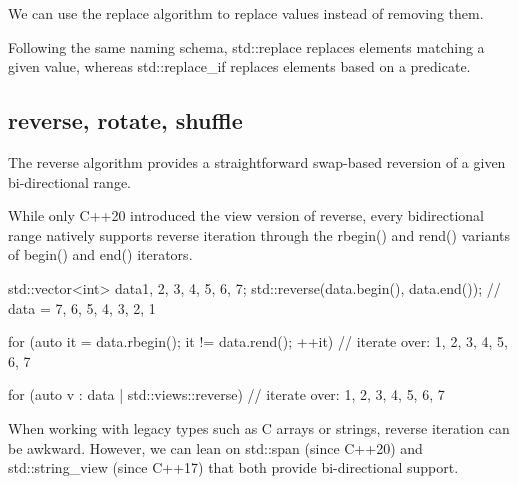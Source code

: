 We can use the replace algorithm to replace values instead of removing them.



Following the same naming schema, std::replace replaces elements matching a given value, whereas std::replace\_if replaces elements based on a predicate.

\begin{box-note}
\end{box-note}

\subsection{reverse, rotate, shuffle}

The reverse algorithm provides a straightforward swap-based reversion of a given bi-directional range.



While only C++20 introduced the view version of reverse, every bidirectional range natively supports reverse iteration through the rbegin() and rend() variants of begin() and end() iterators.

\begin{box-note}
\begin{cppcode}
std::vector<int> data{1, 2, 3, 4, 5, 6, 7};
std::reverse(data.begin(), data.end());
// data = {7, 6, 5, 4, 3, 2, 1}

for (auto it = data.rbegin(); it != data.rend(); ++it) {
    // iterate over: 1, 2, 3, 4, 5, 6, 7
}

for (auto v : data | std::views::reverse) {
    // iterate over: 1, 2, 3, 4, 5, 6, 7
}
\end{cppcode}
\end{box-note}

When working with legacy types such as C arrays or strings, reverse iteration can be awkward. However, we can lean on std::span (since C++20) and std::string\_view (since C++17) that both provide bi-directional support.

